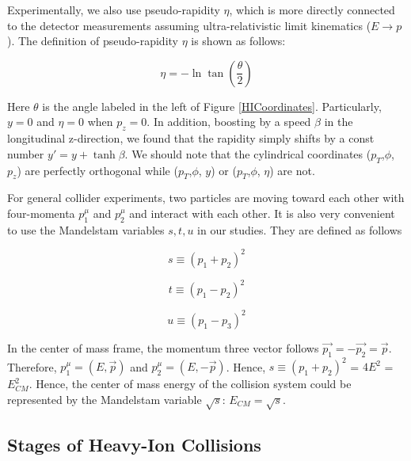 Experimentally, we also use pseudo-rapidity $\eta$, which is more directly connected to the detector measurements assuming ultra-relativistic limit kinematics ($E \rightarrow p$). The definition of pseudo-rapidity $\eta$ is shown as follows:

\begin{equation}
\eta =  - \ln \tan(\frac{\theta}{2})
\end{equation}

Here $\theta$ is the angle labeled in the left of Figure \ref{HICoordinates}. Particularly, $y = 0$ and $\eta = 0$ when $p_z = 0$. In addition, boosting by a speed $\beta$ in the longitudinal z-direction, we found that the rapidity simply shifts by a const number $y' = y + \tanh \beta$. We should note that the cylindrical coordinates ($p_T$,$\phi$, $p_z$) are perfectly orthogonal while ($p_T$,$\phi$, $y$) or ($p_T$,$\phi$, $\eta$) are not.

For general collider experiments, two particles are moving toward each other with four-momenta $p_1^\mu$ and $p_2^\mu$ and interact with each other. It is also very convenient to use the Mandelstam variables $s, t, u$ in our studies. They are defined as follows

\begin{equation}
s \equiv (p_1 + p_2)^2
\end{equation}

\begin{equation}
t \equiv (p_1 - p_2)^2
\end{equation}

\begin{equation}
u \equiv (p_1 - p_3)^2
\end{equation}


In the center of mass frame, the momentum three vector follows $\vec{p_1} = -\vec{p_2} = \vec{p}$. Therefore, $p_1^\mu = (E, \vec{p})$ and $p_2^\mu = (E, -\vec{p})$. Hence, $s \equiv (p_1 + p_2)^2$ = $4E^2$ = $E_{CM}^2$. Hence, the center of mass energy of the collision system could be represented by the Mandelstam variable $\sqrt{s}$: $E_{CM} = \sqrt{s}$.



\subsection{Stages of Heavy-Ion Collisions}

